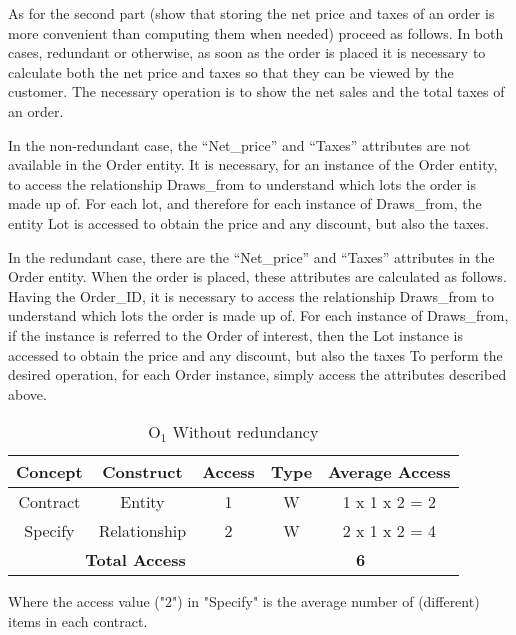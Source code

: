 As for the second part (show that storing the net price and taxes of an order is more convenient than computing them when needed) proceed as follows.
In both cases, redundant or otherwise, as soon as the order is placed it is necessary to calculate both the net price and taxes so that they can be viewed by the customer.
The necessary operation is to show the net sales and the total taxes of an order.

In the non-redundant case, the ``Net\_price'' and ``Taxes'' attributes are not available in the Order entity. It is necessary, for an instance of the Order entity, to access the relationship Draws\_from to understand which lots the order is made up of. For each lot, and therefore for each instance of Draws\_from, the entity Lot is accessed to obtain the price and any discount, but also the taxes.

In the redundant case, there are the ``Net\_price'' and ``Taxes'' attributes in the Order entity. When the order is placed, these attributes are calculated as follows. Having the Order\_ID, it is necessary to access the relationship Draws\_from to understand which lots the order is made up of. For each instance of Draws\_from, if the instance is referred to the Order of interest, then the Lot instance is accessed to obtain the price and any discount, but also the taxes  To perform the desired operation, for each Order instance, simply access the attributes described above.
\begin{table}[!h]\caption{	$ \textrm{O}_\textrm{1} $ Without redundancy}
	\begin{center}
		\begin{tabular}{| c | c | c | c | c |}
			\hline
			\textbf{Concept} & \textbf{Construct} & \textbf{Access} & \textbf{Type} & \textbf{Average Access} \\ \hline
			Contract & Entity & 1 & W & 1 x 1 x 2 = 2 \\ \hline
			Specify & Relationship & 2 & W & 2 x 1 x 2 = 4 \\ \hline
			\multicolumn{3}{|c|}{\textbf{Total Access}} & \multicolumn{2}{|c|}{\textbf{6}} \\ \hline
		\end{tabular}
	\end{center}
\end{table}

Where the access value ("2") in "Specify" is the average number of (different) items in each contract.

